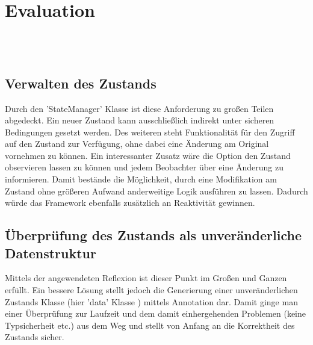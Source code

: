 \section{Evaluation}
\label{sec:evaluation}

\\\\
\subsection{Verwalten des Zustands}
Durch den 'StateManager' Klasse ist diese Anforderung zu großen Teilen abgedeckt. Ein neuer Zustand kann ausschließlich indirekt unter sicheren Bedingungen gesetzt werden. Des weiteren steht Funktionalität für den Zugriff auf den Zustand zur Verfügung, ohne dabei eine Änderung am Original vornehmen zu können. Ein interessanter Zusatz wäre die Option den Zustand observieren lassen zu können und jedem Beobachter über eine Änderung zu informieren. Damit bestände die Möglichkeit, durch eine Modifikation am Zustand ohne größeren Aufwand anderweitige Logik ausführen zu lassen. Dadurch würde das Framework ebenfalls zusätzlich an Reaktivität gewinnen.  

\subsection{Überprüfung des Zustands als unveränderliche Datenstruktur}
Mittels der angewendeten Reflexion ist dieser Punkt im Großen und Ganzen erfüllt. Ein bessere Lösung stellt jedoch die Generierung einer unveränderlichen Zustands Klasse (hier 'data' Klasse ) mittels Annotation dar. Damit ginge man einer Überprüfung zur Laufzeit und dem damit einhergehenden Problemen (keine Typsicherheit etc.) aus dem Weg und stellt von Anfang an die Korrektheit des Zustands sicher. 

